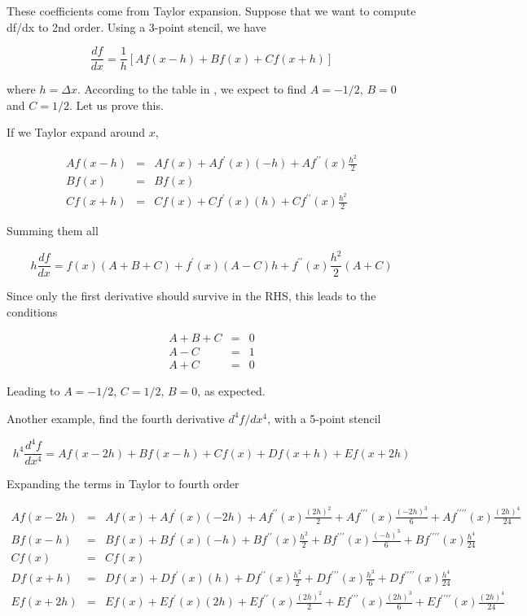 These coefficients come from Taylor expansion. Suppose that we want to compute df/dx to 2nd order. Using a 3-point stencil, we have 

\begin{equation}
\frac{df}{dx} = \frac{1}{h}\left[Af(x-h) + Bf(x) + Cf(x+h)\right]
\end{equation}

where $h=\Delta x$. According to the table in , we expect to find $A=-1/2$, $B=0$ and $C=1/2$. Let us prove this.

If we Taylor expand around $x$, 

\begin{eqnarray}
Af(x-h) &=& Af(x) + Af^\prime(x)(-h) + Af^{\prime\prime}(x)\frac{h^2}{2}  \\
Bf(x)   &=& Bf(x)   \\
Cf(x+h) &=& Cf(x) + Cf^\prime(x)(h) + Cf^{\prime\prime}(x)\frac{h^2}{2} 
\end{eqnarray}

Summing them all 

\begin{equation}
h\frac{df}{dx} = f(x)(A+B+C) + f^\prime(x)(A-C)h + f^{\prime\prime}(x)\frac{h^2}{2}(A+C) 
\end{equation}

Since only the first derivative should survive in the RHS, this leads to the conditions 

\begin{eqnarray}
A+B+C&=&0\\
A-C &=& 1\\
A+C &=& 0 
\end{eqnarray}

Leading to $A=-1/2$, $C=1/2$, $B=0$, as expected.


Another example, find the fourth derivative $d^4f/dx^4$, with a 5-point stencil 


\begin{equation}
h^4\frac{d^4f}{dx^4} = Af(x-2h) + Bf(x-h) + Cf(x) + Df(x+h) + Ef(x+2h)
\end{equation}

Expanding the terms in Taylor to fourth order 

\begin{eqnarray}
Af(x-2h) &=& Af(x) + Af^\prime(x)(-2h) + Af^{\prime\prime}(x)\frac{(2h)^2}{2}  + Af^{\prime\prime\prime}(x)\frac{(-2h)^3}{6}+ Af^{\prime\prime\prime\prime}(x)\frac{(2h)^4}{24}\nonumber\\
Bf(x-h) &=& Bf(x) + Bf^\prime(x)(-h) + Bf^{\prime\prime}(x)\frac{h^2}{2}  + Bf^{\prime\prime\prime}(x)\frac{(-h)^3}{6}+ Bf^{\prime\prime\prime\prime}(x)\frac{h^4}{24}\nonumber\\
Cf(x) &=& Cf(x) \\
Df(x+h) &=& Df(x) + Df^\prime(x)(h) + Df^{\prime\prime}(x)\frac{h^2}{2}  + Df^{\prime\prime\prime}(x)\frac{h^3}{6}+ Df^{\prime\prime\prime\prime}(x)\frac{h^4}{24}\nonumber\\
Ef(x+2h) &=& Ef(x) + Ef^\prime(x)(2h) + Ef^{\prime\prime}(x)\frac{(2h)^2}{2}  + Ef^{\prime\prime\prime}(x)\frac{(2h)^3}{6}+ Ef^{\prime\prime\prime\prime}(x)\frac{(2h)^4}{24}\nonumber
\end{eqnarray}

